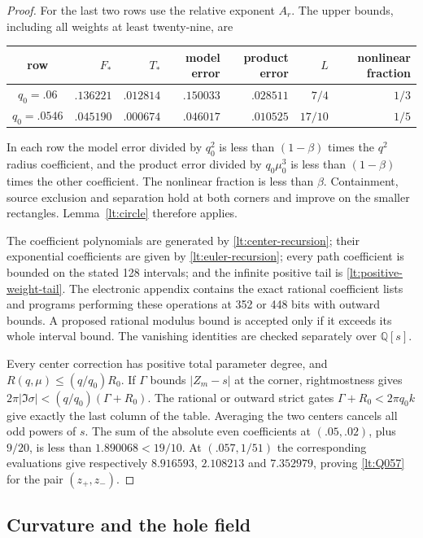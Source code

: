 \begin{proof}
For the last two rows use the relative exponent $A_r$.
The upper bounds, including all weights at least twenty-nine,
are
\begin{center}\small
\begin{tabular}{c|rrrrrr}
\toprule
row&$F_*$&$T_*$&model error&product error&$L$&nonlinear fraction\\\midrule
$q_0=.06$&$.136221$&$.012814$&$.150033$&$.028511$&$7/4$&$1/3$\\
$q_0=.0546$&$.045190$&$.000674$&$.046017$&$.010525$&$17/10$&$1/5$\\\bottomrule
\end{tabular}
\end{center}
In each row the model error divided by $q_0^2$ is less than
$(1-\beta)$ times the $q^2$ radius coefficient, and the product
error divided by $q_0\mu_0^3$ is less than $(1-\beta)$ times the
other coefficient. The nonlinear fraction is less than
$\beta$. Containment, source exclusion and separation hold at both
corners and improve on the smaller rectangles. Lemma~\ref{lt:circle}
therefore applies.

The coefficient polynomials are generated by
\eqref{lt:center-recursion}; their exponential coefficients are given
by \eqref{lt:euler-recursion}; every path coefficient is bounded on
the stated 128 intervals; and the infinite positive tail is
\eqref{lt:positive-weight-tail}. The electronic appendix contains the
exact rational coefficient lists and programs performing these
operations at 352 or 448 bits with outward bounds. A proposed rational
modulus bound is accepted only if it exceeds its whole interval bound.
The vanishing identities are checked separately over $\mathbb Q[s]$.

Every center correction has positive total parameter degree, and
$R(q,\mu)\le(q/q_0)R_0$. If $\Gamma$ bounds $|Z_m-s|$ at
the corner, rightmostness gives
$2\pi|\Im\sigma|<(q/q_0)(\Gamma+R_0)$.
The rational or outward strict gates
$\Gamma+R_0<2\pi q_0k$ give exactly the last column of the table.
Averaging the two centers cancels all odd powers of $s$. The sum of
the absolute even coefficients at $(.05,.02)$, plus $9/20$, is
less than $1.890068<19/10$. At $(.057,1/51)$ the corresponding
evaluations give respectively
$8.916593$, $2.108213$ and $7.352979$, proving
\eqref{lt:Q057} for the pair $(z_+,z_-)$.
\end{proof}

\subsection{Curvature and the hole field}

